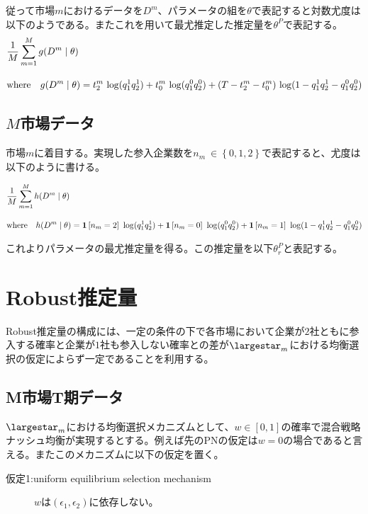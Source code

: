 従って市場$m$におけるデータを$D^m$、パラメータの組を$\theta$で表記すると対数尤度は以下のようである。またこれを用いて最尤推定した推定量を$\theta^P$で表記する。
\begin{align*}
	&\frac{1}{M}\sum_{m = 1}^M g(D^m \mid \theta)\\[10pt]
	&\text{where}\quad g(D^m \mid \theta) = t_2^m\ {\rm log} (q_1^1 q_2^1) + t_0^m\ {\rm log} (q_1^0 q_2^0) + (T - t_2^m - t_0^m)\ {\rm log} (1- q_1^1 q_2^1 - q_1^0 q_2^0)
\end{align*}

\subsection{$M$市場データ}
市場$m$に着目する。実現した参入企業数を$n_m\ \in \left\{ 0,1,2 \right\}$で表記すると、尤度は以下のように書ける。

\begin{align*}
	&\frac{1}{M}\sum_{m = 1}^M h(D^m \mid \theta)\\[10pt]
	&\text{where}\quad h(D^m \mid \theta) = {\bf 1}\left[ n_m = 2 \right]\ {\rm log} (q_1^1 q_2^1) + {\bf 1}\left[ n_m = 0 \right]\ {\rm log} (q_1^0 q_2^0) + {\bf 1}\left[ n_m = 1 \right]\ {\rm log} (1- q_1^1 q_2^1 - q_1^0 q_2^0)
\end{align*}

これよりパラメータの最尤推定量を得る。この推定量を以下$\theta_r^P$と表記する。


\section{Robust推定量}
Robust推定量の構成には、一定の条件の下で各市場において企業が$2$社ともに参入する確率と企業が$1$社も参入しない確率との差が$\largestar_m$における均衡選択の仮定によらず一定であることを利用する。

\subsection{M市場T期データ}
$\largestar_m$における均衡選択メカニズムとして、$w \in [0,1]$の確率で混合戦略ナッシュ均衡が実現するとする。例えば先のPNの仮定は$w = 0$の場合であると言える。またこのメカニズムに以下の仮定を置く。

\begin{description}
\item[仮定1:uniform equilibrium selection mechanism] $w$は$(\epsilon_1, \epsilon_2)$に依存しない。
\end{description}

